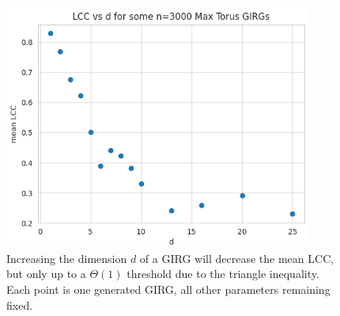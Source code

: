 \begin{figure}
    \centering
    \includegraphics[width=0.9\textwidth]{./figures/LCC_vs_d.png}
    \caption{Increasing the dimension $d$ of a GIRG will decrease the mean LCC, but only up to a $\Theta(1)$ threshold due to the triangle inequality. Each point is one generated GIRG, all other parameters remaining fixed.}
    \label{fig:LCC_vs_d}
\end{figure}






